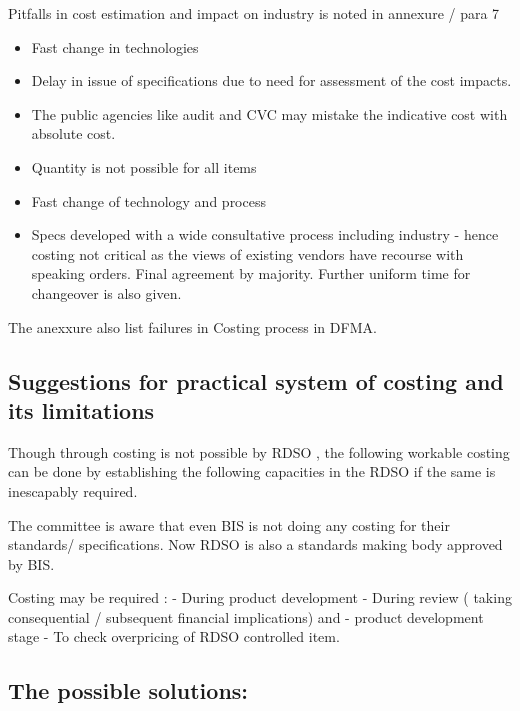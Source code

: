 \documentclass[
  11pt,
  twoside]{article}
\providecommand{\tightlist}{%
  \setlength{\itemsep}{0pt}\setlength{\parskip}{0pt}}
\begin{document}
Pitfalls in cost estimation and impact on industry is noted in annexure / para 7

\begin{itemize}
\tightlist
\item
  Fast change in technologies
\item
  Delay in issue of specifications due to need for assessment of the cost impacts.
\item
  The public agencies like audit and CVC may mistake the indicative cost with absolute cost.
\item
  Quantity is not possible for all items
\item
  Fast change of technology and process
\item
  Specs developed with a wide consultative process including industry - hence costing not critical as the views of existing vendors have recourse with speaking orders. Final agreement by majority. Further uniform time for changeover is also given.
\end{itemize}

The anexxure also list failures in Costing process
in DFMA.

\hypertarget{suggestions-for-practical-system-of-costing-and-its-limitations}{%
\subsection{Suggestions for practical system of costing and its limitations}\label{suggestions-for-practical-system-of-costing-and-its-limitations}}

Though through costing is not possible by RDSO , the following workable costing can be done by establishing the following capacities in the RDSO if the same is inescapably required.

The committee is aware that even BIS is not doing any costing for their standards/ specifications. Now RDSO is also a standards making body approved by BIS.

Costing may be required :
- During product development
- During review ( taking consequential / subsequent financial implications) and
- product development stage
- To check overpricing of RDSO controlled item.

\hypertarget{the-possible-solutions}{%
\subsection{The possible solutions:}\label{the-possible-solutions}}
\end{document}
